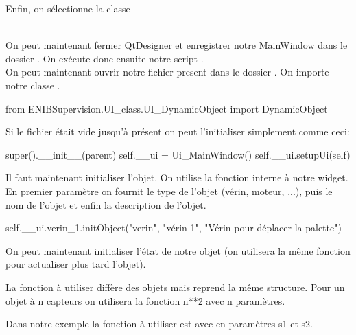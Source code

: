 \documentclass[12pt]{report}    %
\begin{document}

Enfin, on sélectionne la classe 

\textcolor{red}{} \\

On peut maintenant fermer QtDesigner et enregistrer notre MainWindow dans le dossier . On exécute donc ensuite notre script .\\

On peut maintenant ouvrir notre  fichier  present dans le dossier . On importe notre classe .

\begin{pyCode}
from ENIBSupervision.UI_class.UI_DynamicObject import DynamicObject
\end{pyCode}


Si le fichier  était vide jusqu'à présent on peut l'initialiser simplement comme ceci:

\begin{pyCode}
    super().__init__(parent)
    self.__ui = Ui_MainWindow()
    self.__ui.setupUi(self)
\end{pyCode}


Il faut maintenant initialiser l'objet. On utilise la fonction  interne à notre widget. En premier paramètre on fournit le type de l'objet (vérin, moteur, ...), puis le nom de l'objet et enfin la description de l'objet.

\begin{pyCode}
    self.__ui.verin_1.initObject("verin", "vérin 1", "Vérin pour déplacer la palette")
\end{pyCode}

On peut maintenant initialiser l'état de notre objet (on utilisera la même fonction pour actualiser plus tard l'objet). 

La fonction à utiliser diffère  des objets mais reprend la même structure. Pour un objet à n capteurs on utilisera la fonction  n**2  avec n paramètres.

Dans notre exemple la fonction à utiliser est  avec en paramètres s1 et s2. 
\end{document}
